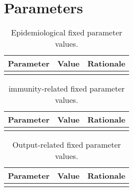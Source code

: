 \documentclass{article}
\begin{document}

\section{Parameters}


\begin{table}
    \begin{tabularx}{\textwidth}{| X | X | X |}
    \hline
    Parameter & Value & Rationale \\
    \hline
     \\
    \hline
    \end{tabularx}
	\caption{Epidemiological fixed parameter values.}
    \label{tab:fixed_params}
\end{table}

\begin{table}
    \begin{tabularx}{\textwidth}{| X | X | X |}
    \hline
    Parameter & Value & Rationale \\
    \hline
     \\
    \hline
    \end{tabularx}
	\caption{immunity-related fixed parameter values.}
    \label{tab:immunity_params}
\end{table}

\begin{table}
    \begin{tabularx}{\textwidth}{| X | X | X |}
    \hline
    Parameter & Value & Rationale \\
    \hline
     \\
    \hline
    \end{tabularx}
	\caption{Output-related fixed parameter values.}
    \label{tab:output_params}
\end{table}

\newpage    
\printbibliography
\end{document}
